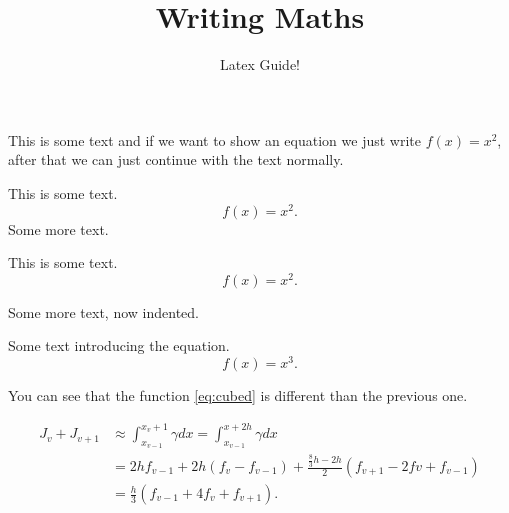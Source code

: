 \documentclass{article}
\author{Latex Guide!}
\title{Writing Maths}
\date{}
\begin{document}
    \maketitle
    This is some text and if we want to show an equation we just write $f(x) = x^2$, after that we can just continue with the text normally.

    This is some text.
    \begin{equation*}
      f(x) = x^2.
    \end{equation*}
    Some more text.

    This is some text.
    \begin{equation*}
      f(x) = x^2.
    \end{equation*}
  
    Some more text, now indented.

    Some text introducing the equation.
    \begin{equation}\label{eq:cubed}
      f(x) = x^3.
    \end{equation}

    You can see that the function \eqref{eq:cubed} is different than the previous one.

    \begin{align*}
      J_v+J_{v+1}&\approx \int_{x_{v-1}}^{x_v+1} \gamma dx=\int_{x_{v-1}}^{x+2h} \gamma dx \\ 
      &=2hf_{v-1}+2h(f_v-f_{v-1})+\frac{\frac{8}{3}h-2h}{2}(f_{v+1}-2fv+f_{v-1})\\
      &=\frac{h}{3}(f_{v-1}+4f_v+f_{v+1}).
      \end{align*}
  
\end{document}
